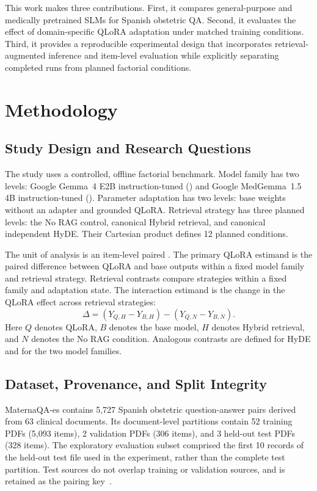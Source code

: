 This work makes three contributions. First, it compares general-purpose and
medically pretrained SLMs for Spanish obstetric QA. Second, it evaluates
the effect of domain-specific QLoRA adaptation under matched training
conditions. Third, it provides a reproducible experimental design that
incorporates retrieval-augmented inference and item-level evaluation while
explicitly separating completed runs from planned factorial conditions.

\section{Methodology}
\subsection{Study Design and Research Questions}
The study uses a controlled, offline factorial benchmark. Model family has
two levels: Google Gemma~4 E2B instruction-tuned
() and Google MedGemma~1.5 4B instruction-tuned
(). Parameter adaptation has two levels:
base weights without an adapter and grounded QLoRA. Retrieval strategy has
three planned levels: the No RAG control, canonical
Hybrid retrieval, and canonical independent HyDE. Their Cartesian product
defines 12 planned conditions.

The unit of analysis is an item-level paired . The primary
QLoRA estimand is the paired difference between QLoRA and base outputs
within a fixed model family and retrieval strategy. Retrieval contrasts
compare strategies within a fixed family and adaptation state. The
interaction estimand is the change in the QLoRA effect across retrieval
strategies:
\begin{equation}
\label{eq:interaction}
\Delta = (Y_{Q,H} - Y_{B,H}) - (Y_{Q,N} - Y_{B,N}).
\end{equation}
Here $Q$ denotes QLoRA, $B$ denotes the base model, $H$ denotes Hybrid
retrieval, and $N$ denotes the No RAG condition. Analogous contrasts
are defined for HyDE and for the two model families.

\subsection{Dataset, Provenance, and Split Integrity}
MaternaQA-es contains 5,727 Spanish obstetric question-answer pairs derived
from 63 clinical documents. Its document-level partitions contain 52
training PDFs (5,093 items), 2 validation PDFs (306 items), and 3 held-out
test PDFs (328 items). The exploratory evaluation subset comprised the
first 10 records of the held-out test file used in the experiment, rather
than the complete test partition. Test sources do not overlap training or
validation sources, and  is retained as the pairing
key~\cite{maternaqa2026}.

